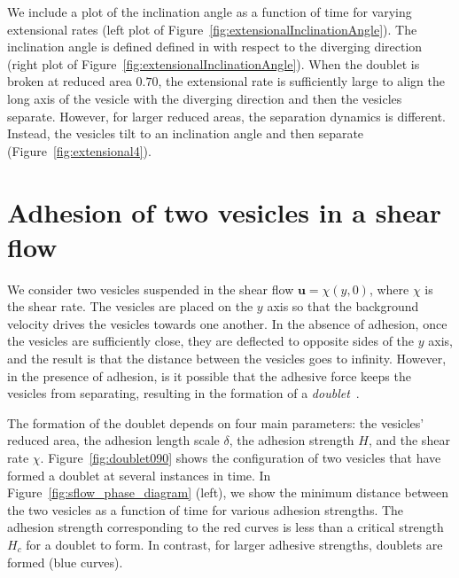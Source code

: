 \documentclass[prf,superscriptaddress,showpacs]{revtex4-1}
\newcommand{\uu}{\mathbf{u}}
\begin{document}
We include a plot of the inclination angle as a function of time for
varying extensional rates (left plot of
Figure~\ref{fig:extensionalInclinationAngle}).  The inclination angle is
defined defined in with respect to the diverging direction (right plot
of Figure~\ref{fig:extensionalInclinationAngle}).  When the doublet is
broken at reduced area $0.70$, the extensional rate is sufficiently
large to align the long axis of the vesicle with the diverging direction
and then the vesicles separate.  However, for larger reduced areas, the
separation dynamics is different.  Instead, the vesicles tilt to an
inclination angle and then separate (Figure~\ref{fig:extensional4}).


\section{Adhesion of two vesicles in a shear flow}
\label{sec:sflow} 
We consider two vesicles suspended in the shear flow $\uu = \chi(y,0)$,
where $\chi$ is the shear rate.  The vesicles are placed on the $y$ axis
so that the background velocity drives the vesicles towards one another.
In the absence of adhesion, once the vesicles are sufficiently close,
they are deflected to opposite sides of the $y$ axis, and the result is
that the distance between the vesicles goes to infinity.  However, in
the presence of adhesion, is it possible that the adhesive force keeps
the vesicles from separating, resulting in the formation of a {\em
doublet}~\cite{}.

The formation of the doublet depends on four main parameters: the
vesicles' reduced area, the adhesion length scale $\delta$, the adhesion
strength $H$, and the shear rate $\chi$.  Figure~\ref{fig:doublet090}
shows the configuration of two vesicles that have formed a doublet at
several instances in time.  In Figure~\ref{fig:sflow_phase_diagram}
(left), we show the minimum distance between the two vesicles as a
function of time for various adhesion strengths.  The adhesion strength
corresponding to the red curves is less than a critical strength $H_c$
for a doublet to form.  In contrast, for larger adhesive strengths,
doublets are formed (blue curves).
\end{document}
